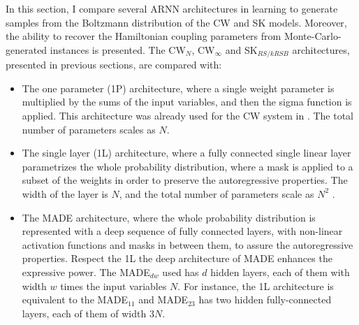 \documentclass[aps,physrev,10pt,floatfix,reprint]{revtex4-2}
\begin{document}
In this section, I compare several ARNN architectures in learning to generate samples from the Boltzmann distribution of the CW and SK models. 
Moreover, the ability to recover the Hamiltonian coupling parameters from Monte-Carlo-generated instances is presented. 
The CW$_N$, CW$_{\infty}$ and SK$_{RS/kRSB}$ architectures, presented in previous sections, are compared with: 
\begin{itemize}
    \item The one parameter (1P) architecture, where a single weight parameter is multiplied by the sums of the input variables, and then the sigma function is applied. This architecture was already used for the CW system in \cite{https://doi.org/10.48550/arxiv.2210.11145}. The total number of parameters scales as $N$.
    \item The single layer (1L) architecture, where a fully connected single linear layer parametrizes the whole probability distribution, where a mask is applied to a subset of the weights in order to preserve the autoregressive properties. The width of the layer is $N$, and the total number of parameters scale as $N^2$ \cite{pmlr-v37-germain15}.
    \item The MADE architecture\cite{pmlr-v37-germain15}, where the whole probability distribution is represented with a deep sequence of fully connected layers, with non-linear activation functions and masks in between them, to assure the autoregressive properties. Respect the 1L the deep architecture of MADE enhances the expressive power. The MADE$_{dw}$ used has $d$ hidden layers, each of them with width $w$ times the input variables $N$. For instance, the 1L architecture is equivalent to the MADE$_{11}$ and MADE$_{23}$ has two hidden fully-connected layers, each of them of width $3N$. 
\end{itemize}
\end{document}
